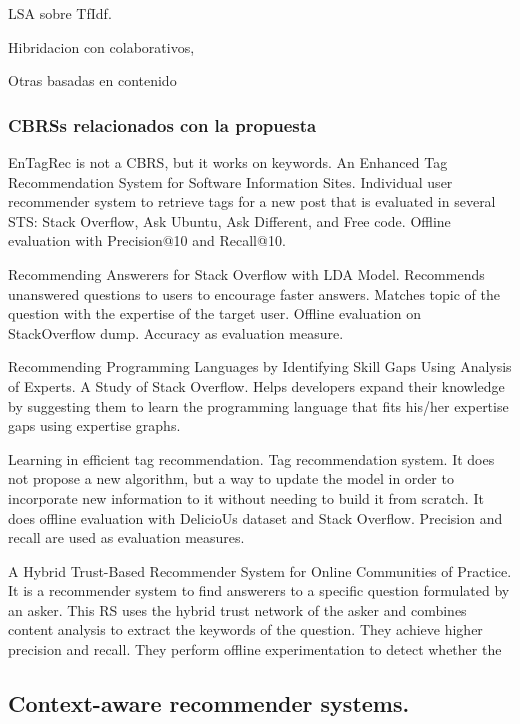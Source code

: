 \documentclass[preprint]{elsarticle}
\begin{document}
\begin{spacing}{2}
LSA sobre TfIdf.

Hibridacion con colaborativos, \cite{Symeonidis2007} 

Otras basadas en contenido

\subsubsection{CBRSs relacionados con la propuesta}

EnTagRec \cite{Wang2014} is not a CBRS, but it works on keywords. An Enhanced Tag Recommendation System for Software Information Sites. Individual user recommender system to retrieve tags for a new post that is evaluated in several STS: Stack Overflow, Ask Ubuntu, Ask Different, and Free code. Offline evaluation with Precision@10 and Recall@10.

\cite{Shao2017} Recommending Answerers for Stack Overflow with LDA Model. Recommends unanswered questions to users to encourage faster answers. Matches topic of the question with the expertise of the target user. Offline evaluation on StackOverflow dump. Accuracy as evaluation measure.

\cite{Odiete2017} Recommending Programming Languages by Identifying Skill Gaps Using Analysis of Experts. A Study of Stack Overflow. Helps developers expand their knowledge by suggesting them to learn the programming language that fits his/her expertise gaps using expertise graphs.

\cite{Lipczak2010} Learning in efficient tag recommendation. Tag recommendation system. It does not propose a new algorithm, but a way to update the model in order to incorporate new information to it without needing to build it from scratch. It does offline evaluation with DelicioUs dataset and Stack Overflow. Precision and recall are used as evaluation measures.

\cite{Zheng2015b} A Hybrid Trust-Based Recommender System for Online Communities of Practice. It is a recommender system to find answerers to a specific question formulated by an asker. This RS uses the hybrid trust network of the asker and combines content analysis to extract the keywords of the question. They achieve higher precision and recall. They perform offline experimentation to detect whether the


\subsection{Context-aware recommender systems.}


\end{spacing}
\end{document}
